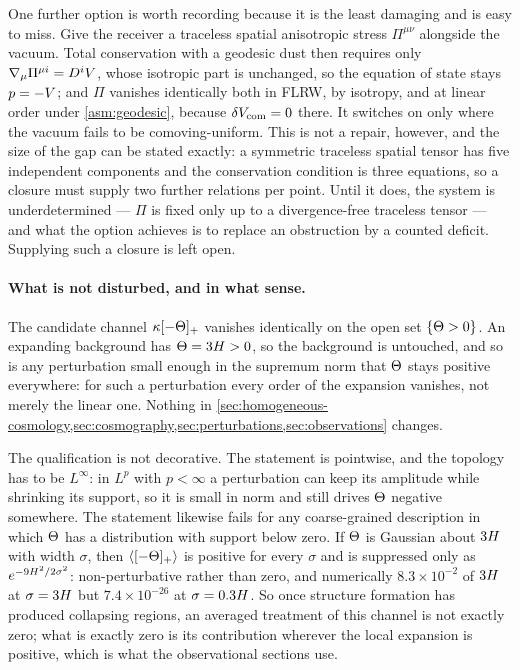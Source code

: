 One further option is worth recording because it is the least damaging and is
easy to miss. Give the receiver a traceless spatial anisotropic stress
$\Pi^{\mu\nu}$ alongside the vacuum. Total conservation with a geodesic dust
then requires only $\nabla_\mu\Pi^{\mu i}=D^i V$, whose isotropic part is
unchanged, so the equation of state stays $p=-V$; and $\Pi$ vanishes
identically both in FLRW, by isotropy, and at linear order under
\cref{asm:geodesic}, because $\delta V_{\rm com}=0$ there. It switches on
only where the vacuum fails to be comoving-uniform. This is not a repair,
however, and the size of the gap can be stated exactly: a symmetric traceless
spatial tensor has five independent components and the conservation condition
is three equations, so a closure must supply two further relations per point.
Until it does, the system is underdetermined --- $\Pi$ is fixed only up to a
divergence-free traceless tensor --- and what the option achieves is to replace
an obstruction by a counted deficit. Supplying such a closure is left open.

\paragraph{What is not disturbed, and in what sense.} The candidate channel
$\kappa[-\Theta]_+$ vanishes identically on the open set $\{\Theta>0\}$. An
expanding background has $\Theta=3H>0$, so the background is untouched, and
so is any perturbation small enough in the supremum norm that $\Theta$ stays
positive everywhere: for such a perturbation every order of the expansion
vanishes, not merely the linear one. Nothing in
\cref{sec:homogeneous-cosmology,sec:cosmography,sec:perturbations,sec:observations}
changes.

The qualification is not decorative. The statement is pointwise, and the
topology has to be $L^\infty$: in $L^p$ with $p<\infty$ a perturbation can keep
its amplitude while shrinking its support, so it is small in norm and still
drives $\Theta$ negative somewhere. The statement likewise fails for any
coarse-grained description in which $\Theta$ has a distribution with support
below zero. If $\Theta$ is Gaussian about $3H$ with width $\sigma$, then
$\left\langle [-\Theta]_+ \right\rangle$ is positive for every $\sigma$ and is suppressed only as
$e^{-9H^2/2\sigma^2}$: non-perturbative rather than zero, and numerically
$8.3\times10^{-2}$ of $3H$ at $\sigma=3H$ but $7.4\times10^{-26}$ at
$\sigma=0.3H$. So once structure formation has produced collapsing regions,
an averaged treatment of this channel is not exactly zero; what is exactly zero
is its contribution wherever the local expansion is positive, which is what the
observational sections use.

